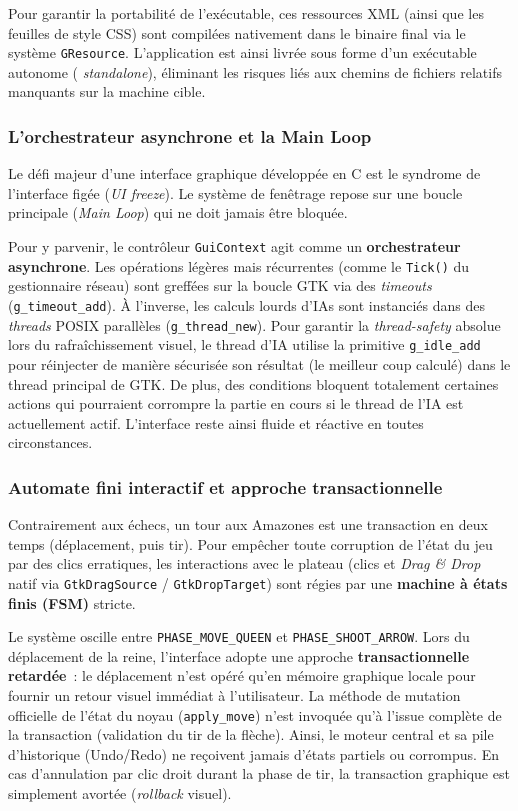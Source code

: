 \documentclass[a4paper]{article}
\begin{document}
Pour garantir la portabilité de l'exécutable, ces ressources XML (ainsi que les feuilles de style CSS) sont compilées nativement dans le binaire final via le système \texttt{GResource}. L'application est ainsi livrée sous forme d'un exécutable autonome ( \textit{standalone}), éliminant les risques liés aux chemins de fichiers relatifs manquants sur la machine cible.

\subsubsection{L'orchestrateur asynchrone et la Main Loop}

Le défi majeur d'une interface graphique développée en C est le syndrome de l'interface figée (\textit{UI freeze}). Le système de fenêtrage repose sur une boucle principale (\textit{Main Loop}) qui ne doit jamais être bloquée.

Pour y parvenir, le contrôleur \texttt{GuiContext} agit comme un \textbf{orchestrateur asynchrone}. Les opérations légères mais récurrentes (comme le \texttt{Tick()} du gestionnaire réseau) sont greffées sur la boucle GTK via des \textit{timeouts} (\texttt{g\_timeout\_add}). À l'inverse, les calculs lourds d'IAs sont instanciés dans des \textit{threads} POSIX parallèles (\texttt{g\_thread\_new}). Pour garantir la \textit{thread-safety} absolue lors du rafraîchissement visuel, le thread d'IA utilise la primitive \texttt{g\_idle\_add} pour réinjecter de manière sécurisée son résultat (le meilleur coup calculé) dans le thread principal de GTK. De plus, des conditions bloquent totalement certaines actions qui pourraient corrompre la partie en cours si le thread de l'IA est actuellement actif. L'interface reste ainsi fluide et réactive en toutes circonstances.

\subsubsection{Automate fini interactif et approche transactionnelle}

Contrairement aux échecs, un tour aux Amazones est une transaction en deux temps (déplacement, puis tir). Pour empêcher toute corruption de l'état du jeu par des clics erratiques, les interactions avec le plateau (clics et \textit{Drag \& Drop} natif via \texttt{GtkDragSource} / \texttt{GtkDropTarget}) sont régies par une \textbf{machine à états finis (FSM)} stricte.

Le système oscille entre \texttt{PHASE\_MOVE\_QUEEN} et \texttt{PHASE\_SHOOT\_ARROW}. Lors du déplacement de la reine, l'interface adopte une approche \textbf{transactionnelle retardée}~: le déplacement n'est opéré qu'en mémoire graphique locale pour fournir un retour visuel immédiat à l'utilisateur. La méthode de mutation officielle de l'état du noyau (\texttt{apply\_move}) n'est invoquée qu'à l'issue complète de la transaction (validation du tir de la flèche). Ainsi, le moteur central et sa pile d'historique (Undo/Redo) ne reçoivent jamais d'états partiels ou corrompus. En cas d'annulation par clic droit durant la phase de tir, la transaction graphique est simplement avortée (\textit{rollback} visuel).
\end{document}
